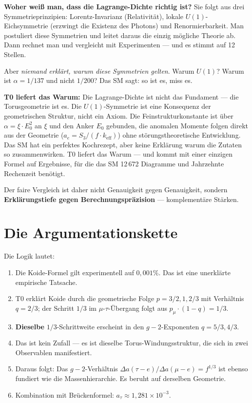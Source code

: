 \textbf{Woher weiß man, dass die Lagrange-Dichte richtig ist?} Sie folgt aus drei Symmetrieprinzipien: Lorentz-Invarianz (Relativität), lokale $U(1)$-Eichsymmetrie (erzwingt die Existenz des Photons) und Renormierbarkeit. Man postuliert diese Symmetrien und leitet daraus die einzig mögliche Theorie ab. Dann rechnet man und vergleicht mit Experimenten — und es stimmt auf 12 Stellen.

Aber \textit{niemand erklärt, warum diese Symmetrien gelten}. Warum $U(1)$? Warum ist $\alpha = 1/137$ und nicht $1/200$? Das SM sagt: so ist es, miss es.

\textbf{T0 liefert das Warum:} Die Lagrange-Dichte ist nicht das Fundament — die Torusgeometrie ist es. Die $U(1)$-Symmetrie ist eine Konsequenz der geometrischen Struktur, nicht ein Axiom. Die Feinstrukturkonstante ist über $\alpha = \xi \cdot E_0^2$ an $\xi$ und den Anker $E_0$ gebunden, die anomalen Momente folgen direkt aus der Geometrie ($a_e = S_3/(f \cdot k_\text{eff})$) ohne störungstheoretische Entwicklung. Das SM hat ein perfektes Kochrezept, aber keine Erklärung warum die Zutaten so zusammenwirken. T0 liefert das Warum — und kommt mit einer einzigen Formel auf Ergebnisse, für die das SM 12\,672 Diagramme und Jahrzehnte Rechenzeit benötigt.

Der faire Vergleich ist daher nicht Genauigkeit gegen Genauigkeit, sondern \textbf{Erklärungstiefe gegen Berechnungspräzision} — komplementäre Stärken.

\section{Die Argumentationskette}

Die Logik lautet:
\begin{enumerate}
	\item Die Koide-Formel gilt experimentell auf $0{,}001\%$. Das ist eine unerklärte empirische Tatsache.
	\item T0 erklärt Koide durch die geometrische Folge $p = 3/2, 1, 2/3$ mit Verhältnis $q = 2/3$; der Schritt $1/3$ im $\mu$-$\tau$-Übergang folgt aus $p_\mu \cdot (1-q) = 1/3$.
	\item \textbf{Dieselbe} $1/3$-Schrittweite erscheint in den $g-2$-Exponenten $q = 5/3, 4/3$.
	\item Das ist kein Zufall — es ist dieselbe Torus-Windungsstruktur, die sich in zwei Observablen manifestiert.
	\item Daraus folgt: Das $g-2$-Verhältnis $\Delta a(\tau{-}e)/\Delta a(\mu{-}e) = f^{1/3}$ ist ebenso fundiert wie die Massenhierarchie. Es beruht auf derselben Geometrie.
	\item Kombination mit Brückenformel: $a_\tau \approx 1{,}281 \times 10^{-3}$.
\end{enumerate}

